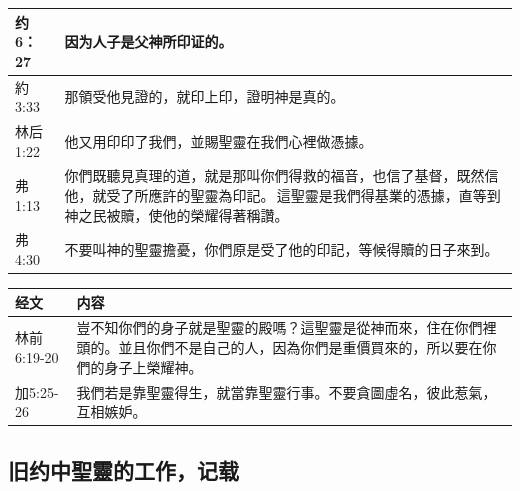 \begin{table}[H]
\begin{tabular}{p{6em}|p{40em}}
约6：27&因为人子是父神所印证的。\\  \midrule 
約3:33&那領受他見證的，就印上印，證明神是真的。\\  \midrule
林后1:22&他又用印印了我們，並賜聖靈在我們心裡做憑據。\\  \midrule
弗1:13&你們既聽見真理的道，就是那叫你們得救的福音，也信了基督，既然信他，就受了所應許的聖靈為印記。 這聖靈是我們得基業的憑據，直等到神之民被贖，使他的榮耀得著稱讚。\\  \midrule 
弗4:30&不要叫神的聖靈擔憂，你們原是受了他的印記，等候得贖的日子來到。 \\  \midrule


\end{tabular}
\end{table}
 


 
\begin{table}[H]
\centering
\begin{tabular}{p{6em}|p{40em}}  \toprule
经文&内容\\  \midrule
林前6:19-20&豈不知你們的身子就是聖靈的殿嗎？這聖靈是從神而來，住在你們裡頭的。並且你們不是自己的人，因為你們是重價買來的，所以要在你們的身子上榮耀神。\\  \midrule
加5:25-26&我們若是靠聖靈得生，就當靠聖靈行事。不要貪圖虛名，彼此惹氣，互相嫉妒。\\  \midrule
\end{tabular}
\end{table}




\subsection{旧约中聖靈的工作，记载}
